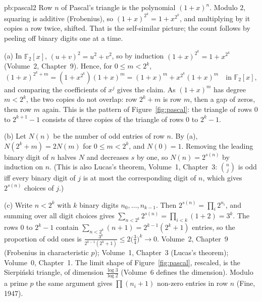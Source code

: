 \begin{solution}{pb:pascal2}
\idea Row $n$ of Pascal's triangle is the polynomial $(1+x)^n$. Modulo $2$, squaring is additive (Frobenius), so
$(1+x)^{2^k}=1+x^{2^k}$, and multiplying by it copies a row twice, shifted. That is the self-similar picture; the count follows
by peeling off binary digits one at a time.

\writeup (a) In $\mathbb F_2[x]$, $(u+v)^2=u^2+v^2$, so by induction $(1+x)^{2^k}=1+x^{2^k}$ (Volume~2, Chapter~9). Hence, for
$0\le m<2^k$,
\[
(1+x)^{2^k+m}=(1+x^{2^k})(1+x)^m=(1+x)^m+x^{2^k}(1+x)^m\quad\text{in }\mathbb F_2[x],
\]
and comparing the coefficients of $x^j$ gives the claim. As $(1+x)^m$ has degree $m<2^k$, the two copies do not overlap: row
$2^k+m$ is row $m$, then a gap of zeros, then row $m$ again. This is the pattern of Figure~\ref{fig:pascal}: the triangle of
rows $0$ to $2^{k+1}-1$ consists of three copies of the triangle of rows $0$ to $2^k-1$.

(b) Let $N(n)$ be the number of odd entries of row $n$. By (a), $N(2^k+m)=2N(m)$ for $0\le m<2^k$, and $N(0)=1$. Removing the
leading binary digit of $n$ halves $N$ and decreases $s$ by one, so $N(n)=2^{s(n)}$ by induction on $n$. (This is also
Lucas's theorem, Volume~1, Chapter~3: $\binom nj$ is odd iff every binary digit of $j$ is at most the corresponding digit of
$n$, which gives $2^{s(n)}$ choices of $j$.)

(c) Write $n<2^k$ with $k$ binary digits $n_0,\dots,n_{k-1}$. Then $2^{s(n)}=\prod_i2^{n_i}$, and summing over all digit
choices gives $\sum_{n<2^k}2^{s(n)}=\prod_{i<k}(1+2)=3^k$. The rows $0$ to $2^k-1$ contain $\sum_{n<2^k}(n+1)=2^{k-1}(2^k+1)$
entries, so the proportion of odd ones is $\frac{3^k}{2^{k-1}(2^k+1)}\le2\bigl(\frac34\bigr)^k\to0$.
\tools Volume~2, Chapter~9 (Frobenius in characteristic $p$); Volume~1, Chapter~3 (Lucas's theorem); Volume~0, Chapter~1.
\leads The limit shape of Figure~\ref{fig:pascal}, rescaled, is the Sierpiński triangle, of dimension $\frac{\log3}{\log2}$
(Volume~6 defines the dimension). Modulo a prime $p$ the same argument gives $\prod(n_i+1)$ non-zero entries in row $n$ (Fine,
1947).
\end{solution}

